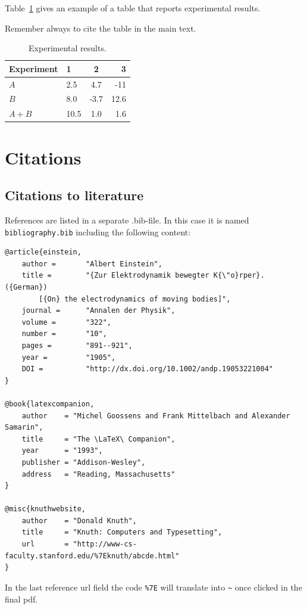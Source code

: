 Table~\ref{table:results} gives an example of a table that reports experimental results.

Remember always to cite the table in the main text. 

\begin{table}[t!]
\begin{center}
\caption{Experimental results.\label{table:results}}
\begin{tabular}{l||l c r} 
Experiment & 1 & 2 & 3 \\ 
\hline \hline 
$A$ & 2.5 & 4.7 & -11 \\
$B$ & 8.0 & -3.7 & 12.6 \\
$A+B$ & 10.5 & 1.0 & 1.6 \\
\hline
%
\end{tabular}
\end{center}
\end{table}

\chapter{Citations}

\section{Citations to literature}

References are listed in a separate .bib-file. In this case it is named \texttt{bibliography.bib} including the following content:
\begin{verbatim}
@article{einstein,
    author =       "Albert Einstein",
    title =        "{Zur Elektrodynamik bewegter K{\"o}rper}. ({German})
        [{On} the electrodynamics of moving bodies]",
    journal =      "Annalen der Physik",
    volume =       "322",
    number =       "10",
    pages =        "891--921",
    year =         "1905",
    DOI =          "http://dx.doi.org/10.1002/andp.19053221004"
}
 
@book{latexcompanion,
    author    = "Michel Goossens and Frank Mittelbach and Alexander Samarin",
    title     = "The \LaTeX\ Companion",
    year      = "1993",
    publisher = "Addison-Wesley",
    address   = "Reading, Massachusetts"
}
 
@misc{knuthwebsite,
    author    = "Donald Knuth",
    title     = "Knuth: Computers and Typesetting",
    url       = "http://www-cs-faculty.stanford.edu/%7Eknuth/abcde.html"
}
\end{verbatim}

In the last reference url field the code \verb+%7E+ will translate into \verb+~+ once clicked in the final pdf.

